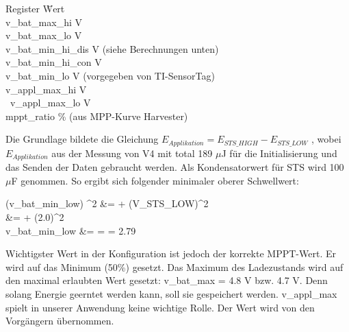 \begin{minipage}{\textwidth}
    \begin{tabbing}
    Register\hspace{4cm} \quad\= Wert \\[0.8ex]
    v\_bat\_max\_hi        V \\
    v\_bat\_max\_lo        V \\
    v\_bat\_min\_hi\_dis   V (siehe Berechnungen unten)\\
    v\_bat\_min\_hi\_con   V \\
    v\_bat\_min\_lo        V (vorgegeben von TI-SensorTag)\\
    v\_appl\_max\_hi       V \\\
    v\_appl\_max\_lo       V \\ 
    mppt\_ratio            \thinspace\% (aus MPP-Kurve Harvester)\\
    \end{tabbing}
\end{minipage}

Die Grundlage bildete die Gleichung  $E_{Applikation}= E_{STS\_HIGH} - E_{STS\_LOW}$ , wobei  $E_{Applikation}$ aus der Messung von V4 mit total 189 $\mu$J für die Initialisierung und das Senden der Daten gebraucht werden. Als Kondensatorwert für STS wird 100 $\mu$F genommen. So ergibt sich folgender minimaler oberer Schwellwert:

\begin{flalign}\label{eq:bat_min_low_schwellwert}
    (v\_bat\_min\_low) ^2  &=   + (V_{STS\_LOW})^2\\
     &=  \frac{2\, \times \, 189, \mu J}{100 \,\mu F} + (2.0)^2\\ \nonumber
    v\_bat\_min\_low  &=  \sqrt{\frac{378}{100 } + 4} = \sqrt{7.8} = 2.79 \\\nonumber
\end{flalign}

Wichtigster Wert in der Konfiguration ist jedoch der korrekte MPPT-Wert. Er wird auf das Minimum (50\thinspace\%) gesetzt. Das Maximum des Ladezustands  wird auf den maximal erlaubten Wert gesetzt: v\_bat\_max  = 4.8 V bzw. 4.7 V. Denn solang Energie geerntet werden kann, soll sie gespeichert werden. v\_appl\_max spielt in unserer Anwendung keine wichtige Rolle. Der Wert wird von den Vorgängern übernommen.

